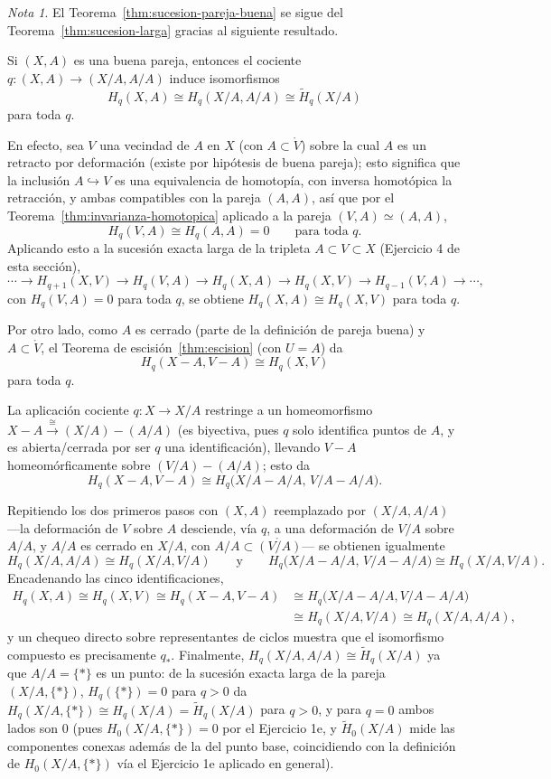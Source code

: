 \documentclass[11pt,a4paper]{article}
\theoremstyle{plain}
\theoremstyle{definition}
\theoremstyle{remark}
\newtheorem{note}[theorem]{Nota}
\begin{document}
\begin{note}
\label{nota:cociente-pareja-buena}
El Teorema~\ref{thm:sucesion-pareja-buena} se sigue del
Teorema~\ref{thm:sucesion-larga} gracias al siguiente resultado.

Si $(X,A)$ es una buena pareja, entonces el cociente $q:(X,A)\to(X/A,A/A)$
induce isomorfismos
\[
H_q(X,A)\cong H_q(X/A,A/A)\cong\tilde H_q(X/A)
\]
para toda $q$.

En efecto, sea $V$ una vecindad de $A$ en $X$ (con $A\subset\mathring V$)
sobre la cual $A$ es un retracto por deformación (existe por hipótesis de
buena pareja); esto significa que la inclusión $A\hookrightarrow V$ es una
equivalencia de homotopía, con inversa homotópica la retracción, y ambas
compatibles con la pareja $(A,A)$, así que por el
Teorema~\ref{thm:invarianza-homotopica} aplicado a la pareja $(V,A)\simeq(A,A)$,
\[
H_q(V,A)\cong H_q(A,A)=0\qquad\text{para toda }q.
\]
Aplicando esto a la sucesión exacta larga de la tripleta $A\subset V\subset X$
(Ejercicio 4 de esta sección),
\[
\cdots\to H_{q+1}(X,V)\to H_q(V,A)\to H_q(X,A)\to H_q(X,V)\to H_{q-1}(V,A)\to\cdots,
\]
con $H_q(V,A)=0$ para toda $q$, se obtiene
$H_q(X,A)\cong H_q(X,V)$ para toda $q$.

Por otro lado, como $A$ es cerrado (parte de la definición de pareja
buena) y $A\subset\mathring V$, el Teorema de
escisión~\ref{thm:escision} (con $U=A$) da
\[
H_q(X-A,V-A)\cong H_q(X,V)
\]
para toda $q$.

La aplicación cociente $q:X\to X/A$ restringe a un homeomorfismo
$X-A\xrightarrow{\cong}(X/A)-(A/A)$ (es biyectiva, pues $q$ solo identifica
puntos de $A$, y es abierta/cerrada por ser $q$ una identificación),
llevando $V-A$ homeomórficamente sobre $(V/A)-(A/A)$; esto da
\[
H_q(X-A,V-A)\cong H_q\big(X/A-A/A,\,V/A-A/A\big).
\]

Repitiendo los dos primeros pasos con $(X,A)$ reemplazado por
$(X/A,A/A)$ ---la deformación de $V$ sobre $A$ desciende, vía $q$, a una
deformación de $V/A$ sobre $A/A$, y $A/A$ es cerrado en $X/A$, con
$A/A\subset\mathring{(V/A)}$--- se obtienen igualmente
\[
H_q(X/A,A/A)\cong H_q(X/A,V/A) \qquad\text{y}\qquad H_q\big(X/A-A/A,\,V/A-A/A\big)\cong H_q(X/A,V/A).
\]
Encadenando las cinco identificaciones,
\[
\begin{aligned}
H_q(X,A)\cong H_q(X,V)\cong H_q(X-A,V-A)&\cong H_q\big(X/A-A/A,V/A-A/A\big)\\
&\cong H_q(X/A,V/A)\cong H_q(X/A,A/A),
\end{aligned}
\]
y un chequeo directo sobre representantes de ciclos muestra que el
isomorfismo compuesto es precisamente $q_*$. Finalmente,
$H_q(X/A,A/A)\cong\tilde H_q(X/A)$ ya que $A/A=\{\ast\}$ es un punto: de
la sucesión exacta larga de la pareja $(X/A,\{\ast\})$,
$H_q(\{\ast\})=0$ para $q>0$ da $H_q(X/A,\{\ast\})\cong H_q(X/A)=\tilde H_q(X/A)$
para $q>0$, y para $q=0$ ambos lados son $0$ (pues $H_0(X/A,\{\ast\})=0$
por el Ejercicio 1e, y $\tilde H_0(X/A)$ mide las componentes conexas
además de la del punto base, coincidiendo con la definición de
$H_0(X/A,\{\ast\})$ vía el Ejercicio 1e aplicado en general).
\end{note}
\end{document}
